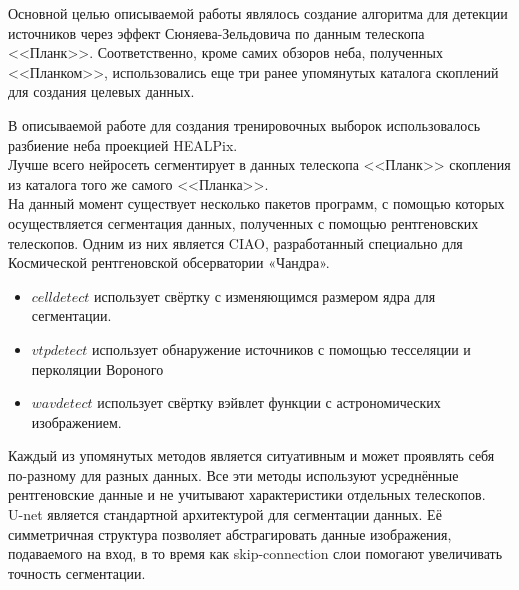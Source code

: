 \documentclass{article}
\begin{document}
Основной целью описываемой работы являлось создание алгоритма для детекции источников через эффект 
Сюняева-Зельдовича по данным телескопа <<Планк>>. Соответственно, кроме самих обзоров неба, полученных 
<<Планком>>, использовались еще три ранее упомянутых каталога скоплений для создания целевых данных.

В описываемой работе для создания тренировочных выборок использовалось разбиение неба проекцией 
HEALPix. \\
Лучше всего нейросеть сегментирует в данных телескопа <<Планк>> 
скопления из каталога того же самого <<Планка>>.\\


На данный момент существует несколько пакетов программ, с помощью которых осуществляется 
сегментация данных, полученных с помощью рентгеновских телескопов. Одним из них является CIAO, разработанный специально для Космической 
рентгеновской обсерватории «Чандра». \\

\begin{itemize}
    \item $celldetect$ использует свёртку с изменяющимся размером ядра для сегментации.
    \item $vtpdetect$ использует обнаружение источников с помощью тесселяции и перколяции Вороного 
    \item $wavdetect$ использует свёртку вэйвлет функции с астрономических изображением.
\end{itemize}

Каждый из упомянутых методов является ситуативным и может проявлять себя по-разному для разных 
данных. Все эти методы используют усреднённые рентгеновские данные и не учитывают характеристики 
отдельных телескопов.\\

U-net является стандартной архитектурой для сегментации данных. 
Её симметричная структура позволяет абстрагировать данные изображения, подаваемого на 
вход, в то время как skip-connection слои помогают увеличивать точность сегментации.
\end{document}

